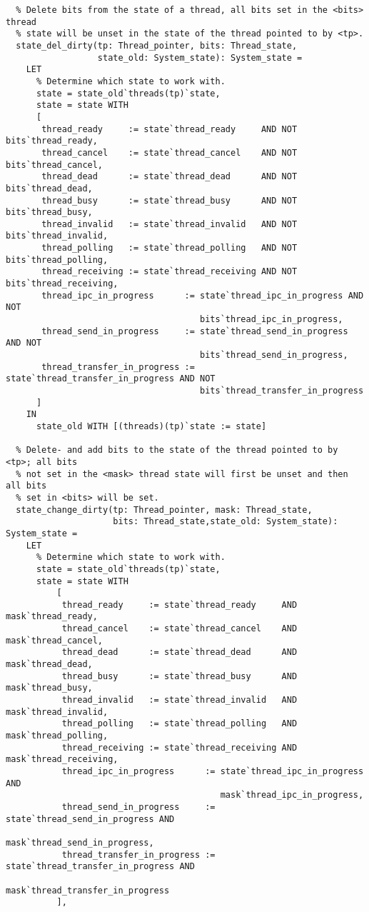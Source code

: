 \begin{lstlisting}
  % Delete bits from the state of a thread, all bits set in the <bits> thread 
  % state will be unset in the state of the thread pointed to by <tp>.
  state_del_dirty(tp: Thread_pointer, bits: Thread_state, 
                  state_old: System_state): System_state =
    LET
      % Determine which state to work with.
      state = state_old`threads(tp)`state,
      state = state WITH 
      [
       thread_ready     := state`thread_ready     AND NOT bits`thread_ready,
       thread_cancel    := state`thread_cancel    AND NOT bits`thread_cancel,
       thread_dead      := state`thread_dead      AND NOT bits`thread_dead,
       thread_busy      := state`thread_busy      AND NOT bits`thread_busy,
       thread_invalid   := state`thread_invalid   AND NOT bits`thread_invalid,
       thread_polling   := state`thread_polling   AND NOT bits`thread_polling,
       thread_receiving := state`thread_receiving AND NOT bits`thread_receiving,
       thread_ipc_in_progress      := state`thread_ipc_in_progress AND NOT
                                      bits`thread_ipc_in_progress,
       thread_send_in_progress     := state`thread_send_in_progress AND NOT
                                      bits`thread_send_in_progress,
       thread_transfer_in_progress := state`thread_transfer_in_progress AND NOT
                                      bits`thread_transfer_in_progress
      ]
    IN
      state_old WITH [(threads)(tp)`state := state]

  % Delete- and add bits to the state of the thread pointed to by <tp>; all bits
  % not set in the <mask> thread state will first be unset and then all bits
  % set in <bits> will be set.
  state_change_dirty(tp: Thread_pointer, mask: Thread_state,
                     bits: Thread_state,state_old: System_state): System_state =
    LET
      % Determine which state to work with.
      state = state_old`threads(tp)`state,
      state = state WITH 
          [
           thread_ready     := state`thread_ready     AND mask`thread_ready,
           thread_cancel    := state`thread_cancel    AND mask`thread_cancel,
           thread_dead      := state`thread_dead      AND mask`thread_dead,
           thread_busy      := state`thread_busy      AND mask`thread_busy,
           thread_invalid   := state`thread_invalid   AND mask`thread_invalid,
           thread_polling   := state`thread_polling   AND mask`thread_polling,
           thread_receiving := state`thread_receiving AND mask`thread_receiving,
           thread_ipc_in_progress      := state`thread_ipc_in_progress AND
                                          mask`thread_ipc_in_progress,
           thread_send_in_progress     := state`thread_send_in_progress AND
                                          mask`thread_send_in_progress,
           thread_transfer_in_progress := state`thread_transfer_in_progress AND
                                          mask`thread_transfer_in_progress
          ],


\end{lstlisting}
